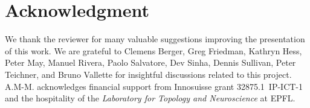 \section*{Acknowledgment}

We thank the reviewer for many valuable suggestions improving the presentation of this work.
We are grateful to Clemens Berger, Greg Friedman, Kathryn Hess, Peter May, Manuel Rivera, Paolo Salvatore, Dev Sinha, Dennis Sullivan, Peter Teichner, and Bruno Vallette for insightful discussions related to this project.
A.M-M. acknowledges financial support from Innosuisse grant 32875.1~IP-ICT-1 and the hospitality of the \textit{Laboratory for Topology and Neuroscience} at EPFL.
